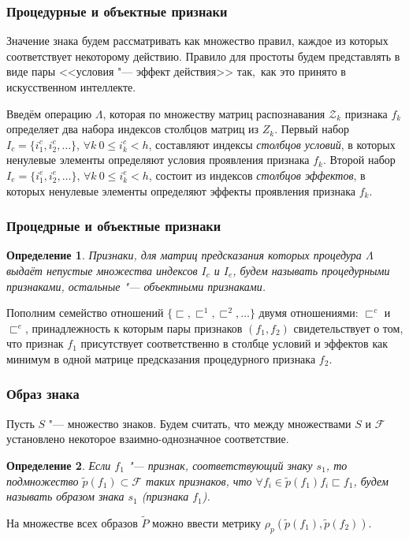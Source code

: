 \documentclass[default]{beamer}
\newtheorem{Def}{Определение}
\begin{document}
	\begin{frame}
		\frametitle{Процедурные и объектные признаки}
		Значение знака будем рассматривать как множество правил, каждое из которых соответствует некоторому действию. Правило для простоты будем представлять в виде пары <<условия "--- эффект действия>> так,~как это принято в искусственном интеллекте. 
		\par\bigskip
		Введём операцию $\Lambda$, которая по множеству матриц распознавания $\mathcal Z_k$ признака $f_k$ определяет два набора индексов столбцов матриц из $Z_k$. Первый набор $I_c=\{i_1^c,i_2^c,\dots\}$, $\forall k\ 0\leqslant i_k^c < h$, составляют индексы \textit{столбцов условий}, в которых ненулевые элементы определяют условия проявления признака $f_k$. Второй набор $I_e=\{i_1^e,i_2^e,\dots\}$, $\forall k\ 0\leqslant i_k^e < h$, состоит из индексов  \textit{столбцов эффектов}, в которых ненулевые элементы определяют эффекты проявления признака $f_k$. 
		
	\end{frame}
	
	\begin{frame}
		\frametitle{Процедрные и объектные признаки}
		
		\begin{Def}
			Признаки, для матриц предсказания которых процедура $\Lambda$ выдаёт непустые множества индексов $I_c$ и $I_e$, будем называть процедурными признаками, остальные "--- объектными признаками.
		\end{Def}
		\par\bigskip
		Пополним семейство отношений $\{\sqsubset,\sqsubset^1,\sqsubset^2,\dots\}$ двумя отношениями: $\sqsubset^c$ и $\sqsubset^e$, принадлежность к которым пары признаков $(f_1,f_2)$ свидетельствует о том, что признак $f_1$ присутствует соответственно в столбце условий и эффектов как минимум в одной матрице предсказания процедурного признака $f_2$.
	\end{frame}
	
	\begin{frame}
		\frametitle{Образ знака}
		
		Пусть $S$ "--- множество знаков. Будем считать, что между множествами $S$ и $\mathcal F$ установлено некоторое взаимно-однозначное соответствие.
		
		\begin{Def}
			Если $f_1$ "--- признак, соответствующий знаку $s_1$, то подмножество $\tilde p(f_1)\subset\mathcal F$ таких признаков, что $\forall f_i\in\tilde p(f_1) f_i\sqsubset f_1$, будем называть образом знака $s_1$ (признака $f_1$).
		\end{Def}
		
		На множестве всех образов $\tilde P$ можно ввести метрику $\rho_p(\tilde p(f_1),\tilde p(f_2))$.
	\end{frame}
	
\end{document}
